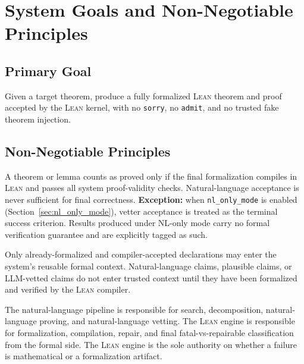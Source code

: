 \documentclass[11pt,a4paper]{article}
\newcommand{\Lean}{\textsc{Lean}}
\begin{document}
\section{System Goals and Non-Negotiable Principles}

\subsection{Primary Goal}
Given a target theorem, produce a fully formalized \Lean{} theorem and proof accepted by the \Lean{} kernel, with no \texttt{sorry}, no \texttt{admit}, and no trusted fake theorem injection.

\subsection{Non-Negotiable Principles}

\begin{mustbox}
A theorem or lemma counts as proved only if the final formalization compiles in \Lean{} and passes all system proof-validity checks. Natural-language acceptance is never sufficient for final correctness. \textbf{Exception:} when \texttt{nl\_only\_mode} is enabled (Section~\ref{sec:nl_only_mode}), vetter acceptance is treated as the terminal success criterion. Results produced under NL-only mode carry no formal verification guarantee and are explicitly tagged as such.
\end{mustbox}

\begin{policybox}
Only already-formalized and compiler-accepted declarations may enter the system's reusable formal context. Natural-language claims, plausible claims, or LLM-vetted claims do not enter trusted context until they have been formalized and verified by the \Lean{} compiler.
\end{policybox}

\begin{policybox}
The natural-language pipeline is responsible for search, decomposition, natural-language proving, and natural-language vetting. The \Lean{} engine is responsible for formalization, compilation, repair, and final fatal-vs-repairable classification from the formal side. The \Lean{} engine is the sole authority on whether a failure is mathematical or a formalization artifact.
\end{policybox}
\end{document}
